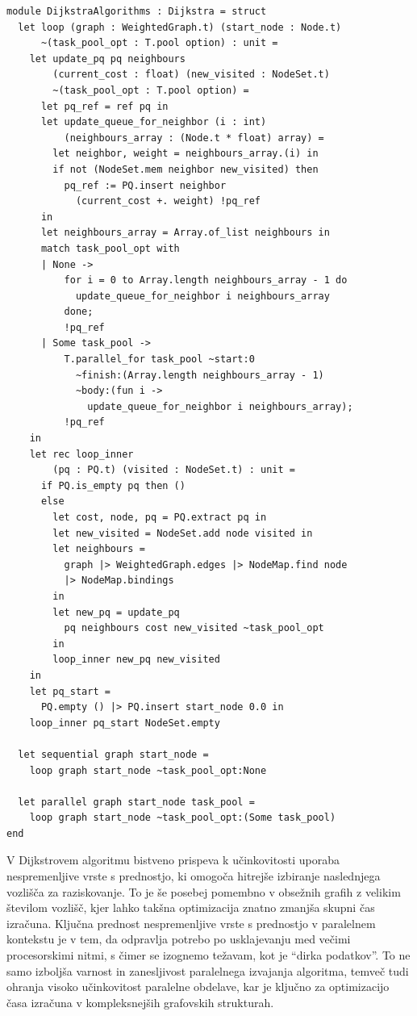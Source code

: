 \documentclass[mat1, tisk]{fmfdelo}
\begin{document}
\begin{lstlisting}
module DijkstraAlgorithms : Dijkstra = struct
  let loop (graph : WeightedGraph.t) (start_node : Node.t)
      ~(task_pool_opt : T.pool option) : unit =
    let update_pq pq neighbours
        (current_cost : float) (new_visited : NodeSet.t)
        ~(task_pool_opt : T.pool option) =
      let pq_ref = ref pq in
      let update_queue_for_neighbor (i : int)
          (neighbours_array : (Node.t * float) array) =
        let neighbor, weight = neighbours_array.(i) in
        if not (NodeSet.mem neighbor new_visited) then
          pq_ref := PQ.insert neighbor 
            (current_cost +. weight) !pq_ref
      in
      let neighbours_array = Array.of_list neighbours in
      match task_pool_opt with
      | None ->
          for i = 0 to Array.length neighbours_array - 1 do
            update_queue_for_neighbor i neighbours_array
          done;
          !pq_ref
      | Some task_pool ->
          T.parallel_for task_pool ~start:0
            ~finish:(Array.length neighbours_array - 1)
            ~body:(fun i -> 
              update_queue_for_neighbor i neighbours_array);
          !pq_ref
    in
    let rec loop_inner 
        (pq : PQ.t) (visited : NodeSet.t) : unit =
      if PQ.is_empty pq then ()
      else
        let cost, node, pq = PQ.extract pq in
        let new_visited = NodeSet.add node visited in
        let neighbours =
          graph |> WeightedGraph.edges |> NodeMap.find node
          |> NodeMap.bindings
        in
        let new_pq = update_pq 
          pq neighbours cost new_visited ~task_pool_opt
        in
        loop_inner new_pq new_visited
    in
    let pq_start = 
      PQ.empty () |> PQ.insert start_node 0.0 in
    loop_inner pq_start NodeSet.empty

  let sequential graph start_node =
    loop graph start_node ~task_pool_opt:None

  let parallel graph start_node task_pool =
    loop graph start_node ~task_pool_opt:(Some task_pool)
end
\end{lstlisting}

V Dijkstrovem algoritmu bistveno prispeva k učinkovitosti uporaba nespremenljive vrste s prednostjo, ki omogoča
hitrejše izbiranje naslednjega vozlišča za raziskovanje. To je še posebej pomembno v obsežnih grafih z velikim številom
vozlišč, kjer lahko takšna optimizacija znatno zmanjša skupni čas izračuna. Ključna prednost nespremenljive vrste s
prednostjo v paralelnem kontekstu je v tem, da odpravlja potrebo po usklajevanju med večimi procesorskimi nitmi,
s čimer se izognemo težavam, kot je ``dirka podatkov''. To ne samo izboljša varnost in zanesljivost paralelnega izvajanja
algoritma, temveč tudi ohranja visoko učinkovitost paralelne obdelave, kar je ključno za optimizacijo časa izračuna v
kompleksnejših grafovskih strukturah.
\end{document}
